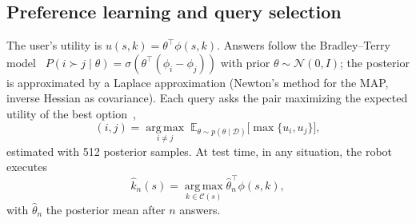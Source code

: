 \subsection{Preference learning and query selection}
\label{sec:preference}
The user's utility is $u(s,k) = \theta^\top \phi(s,k)$. Answers follow the Bradley--Terry model~\citep{bradley1952rank}
$P(i \succ j \mid \theta) = \sigma(\theta^\top(\phi_i - \phi_j))$ with prior $\theta \sim \mathcal{N}(0, I)$; the posterior is
approximated by a Laplace approximation (Newton's method for the MAP, inverse Hessian as covariance).
Each query asks the pair maximizing the expected utility of the best option~\citep{astudillo2023qeubo},
\begin{equation}
  (i,j) = \operatorname*{arg\,max}_{i \ne j} \; \mathbb{E}_{\theta \sim p(\theta \mid \mathcal{D})}\bigl[\max\{u_i, u_j\}\bigr],
\end{equation}
estimated with 512 posterior samples. At test time, in any situation, the robot executes
\begin{equation}
  \hat k_n(s) = \operatorname*{arg\,max}_{k \in \mathcal{C}(s)} \hat\theta_n^{\top}\phi(s,k),
  \label{eq:exec}
\end{equation}
with $\hat\theta_n$ the posterior mean after $n$ answers.



